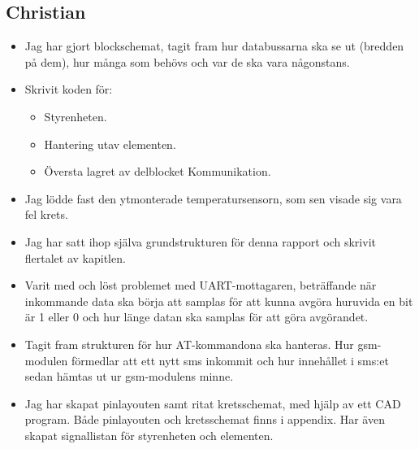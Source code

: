 \documentclass[a4paper]{scrartcl}
\begin{document}
\subsection{Christian}
\begin{itemize}
\item Jag har gjort blockschemat, tagit fram hur databussarna ska se ut (bredden på dem), hur många som behövs och var de ska vara någonstans.
\item Skrivit koden för:
	\begin{itemize}
	\item Styrenheten.
	\item Hantering utav elementen.
	\item Översta lagret av delblocket Kommunikation.
	\end{itemize}
\item Jag lödde fast den ytmonterade temperatursensorn, som sen visade sig vara fel krets.
\item Jag har satt ihop själva grundstrukturen för denna rapport och skrivit flertalet av kapitlen.
\item Varit med och löst problemet med UART-mottagaren, beträffande när inkommande data ska börja att samplas för att kunna avgöra huruvida en bit är 1 eller 0  och hur länge datan ska samplas för att göra avgörandet.
\item Tagit fram strukturen för hur AT-kommandona ska hanteras. Hur gsm-modulen förmedlar att ett nytt sms inkommit och hur innehållet i sms:et sedan hämtas ut ur gsm-modulens minne.
\item Jag har skapat pinlayouten samt ritat kretsschemat, med hjälp av ett CAD program. Både pinlayouten och kretsschemat finns i appendix. Har även skapat signallistan för styrenheten och elementen.
\end{itemize}
\end{document}
